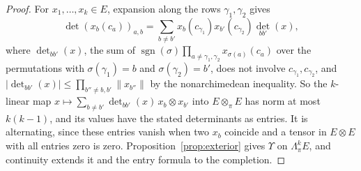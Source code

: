 \documentclass[11pt]{amsart}
\theoremstyle{definition}
\theoremstyle{remark}
\numberwithin{equation}{section}
\newcommand{\sgn}{\operatorname{sgn}}
\newcommand{\abs}[1]{\lvert #1\rvert}
\newcommand{\norm}[1]{\lVert #1\rVert}
\theoremstyle{plain}
\theoremstyle{definition}
\theoremstyle{plain}
\begin{document}
\begin{proof}
For $x_1,\dots,x_k\in E$, expansion along the rows $\gamma_1,\gamma_2$ gives
\[
 \det(x_b(c_a))_{a,b}=\sum_{b\ne b'}x_b(c_{\gamma_1})x_{b'}(c_{\gamma_2})\det_{bb'}(x),
\]
where $\det_{bb'}(x)$, the sum of
$\sgn(\sigma)\prod_{a\ne\gamma_1,\gamma_2}x_{\sigma(a)}(c_a)$ over the permutations with $\sigma(\gamma_1)=b$ and
$\sigma(\gamma_2)=b'$, does not involve $c_{\gamma_1},c_{\gamma_2}$, and
$\abs{\det_{bb'}(x)}\le\prod_{b''\ne b,b'}\norm{x_{b''}}$ by the nonarchimedean inequality. So the $k$\nobreakdash-linear
map $x\mapsto\sum_{b\ne b'}\det_{bb'}(x)\,x_b\otimes x_{b'}$ into $E\otimes_\pi E$ has norm at most $k(k-1)$, and its
values have the stated determinants as entries. It is alternating, since these entries vanish when two $x_b$ coincide
and a tensor in $E\otimes E$ with all entries zero is zero. Proposition~\ref{prop:exterior} gives $\Upsilon$ on
$\Lambda^k_\pi E$, and continuity extends it and the entry formula to the completion.
\end{proof}
\end{document}
